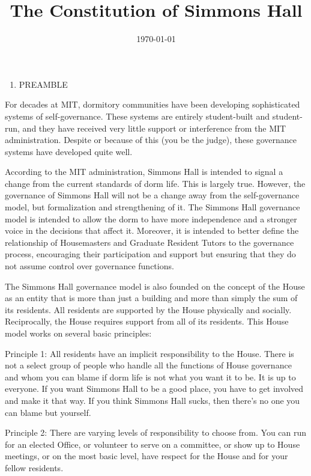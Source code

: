 \documentclass[letterpaper]{article}
\title{The Constitution of Simmons Hall}
\date{\today} %
\begin{document}
\maketitle

\begin{enumerate}
\item PREAMBLE\setcounter{page}{1}\pagestyle{Standard}
\end{enumerate}

For decades at MIT, dormitory communities have been developing sophisticated systems of self-governance. These systems are entirely student-built and student-run, and they have received very little support or interference from the MIT administration. Despite or because of this (you be the judge), these governance systems have developed quite well.

According to the MIT administration, Simmons Hall is intended to signal a change from the current standards of dorm life. This is largely true. However, the governance of Simmons Hall will not be a change away from the self-governance model, but formalization and strengthening of it. The Simmons Hall governance model is intended to allow the dorm to have more independence and a stronger voice in the decisions that affect it. Moreover, it is intended to better define the relationship of Housemasters and Graduate Resident Tutors to the governance process, encouraging their participation and support but ensuring that they do not assume control over governance functions.

The Simmons Hall governance model is also founded on the concept of the House as an entity that is more than just a building and more than simply the sum of its residents. All residents are supported by the House physically and socially. Reciprocally, the House requires support from all of its residents. This House model works on several basic principles:

Principle 1: All residents have an implicit responsibility to the House. There is not a select group of people who handle all the functions of House governance and whom you can blame if dorm life is not what you want it to be. It is up to everyone. If you want Simmons Hall to be a good place, you have to get involved and make it that way. If you think Simmons Hall sucks, then there's no one you can blame but yourself.

Principle 2: There are varying levels of responsibility to choose from. You can run for an elected Office, or volunteer to serve on a committee, or show up to House meetings, or on the most basic level, have respect for the House and for your fellow residents. 
\end{document}

